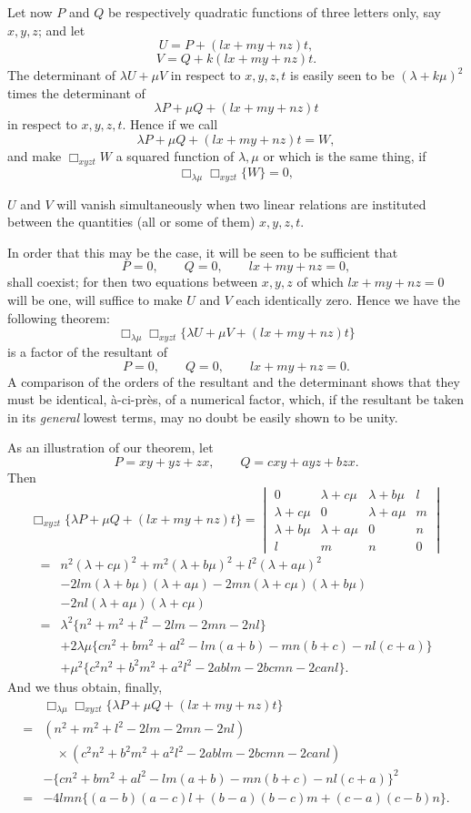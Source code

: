 \documentclass[11pt]{article}
\newcommand{\sourcepage}[1]{\marginpar{\scriptsize p.~#1}}
\begin{document}
Let now $P$ and $Q$ be respectively quadratic functions of three letters only, say $x,y,z$; and let
\[
U=P+(lx+my+nz)t,
\]
\[
V=Q+k(lx+my+nz)t.
\]
The determinant of $\lambda U+\mu V$ in respect to $x,y,z,t$ is easily seen to be $(\lambda+k\mu)^2$ times the determinant of
\[
\lambda P+\mu Q+(lx+my+nz)t
\]
in respect to $x,y,z,t$. Hence if we call
\[
\lambda P+\mu Q+(lx+my+nz)t=W,
\]
and make $\Box_{xyzt}W$ a squared function of $\lambda,\mu$ or which is the same thing, if
\[
\Box_{\lambda\mu}\Box_{xyzt}\{W\}=0,
\]

\sourcepage{140}
$U$ and $V$ will vanish simultaneously when two linear relations are instituted between the quantities (all or some of them) $x,y,z,t$.

In order that this may be the case, it will be seen to be sufficient that
\[
P=0,\qquad Q=0,\qquad lx+my+nz=0,
\]
shall coexist; for then two equations between $x,y,z$ of which $lx+my+nz=0$ will be one, will suffice to make $U$ and $V$ each identically zero. Hence we have the following theorem:
\[
\Box_{\lambda\mu}\Box_{xyzt}\{\lambda U+\mu V+(lx+my+nz)t\}
\]
is a factor of the resultant of
\[
P=0,\qquad Q=0,\qquad lx+my+nz=0.
\]
A comparison of the orders of the resultant and the determinant shows that they must be identical, \`a-ci-pr\`es, of a numerical factor, which, if the resultant be taken in its \emph{general} lowest terms, may no doubt be easily shown to be unity.

As an illustration of our theorem, let
\[
P=xy+yz+zx,\qquad
Q=cxy+ayz+bzx.
\]
Then
\[
\Box_{xyzt}\{\lambda P+\mu Q+(lx+my+nz)t\}
=
\begin{vmatrix}
0&\lambda+c\mu&\lambda+b\mu&l\\
\lambda+c\mu&0&\lambda+a\mu&m\\
\lambda+b\mu&\lambda+a\mu&0&n\\
l&m&n&0
\end{vmatrix}
\]
\[
\begin{aligned}
={}&n^2(\lambda+c\mu)^2+m^2(\lambda+b\mu)^2+l^2(\lambda+a\mu)^2\\
&-2lm(\lambda+b\mu)(\lambda+a\mu)
-2mn(\lambda+c\mu)(\lambda+b\mu)\\
&-2nl(\lambda+a\mu)(\lambda+c\mu)\\
={}&\lambda^2\{n^2+m^2+l^2-2lm-2mn-2nl\}\\
&+2\lambda\mu\{cn^2+bm^2+al^2-lm(a+b)-mn(b+c)-nl(c+a)\}\\
&+\mu^2\{c^2n^2+b^2m^2+a^2l^2-2ablm-2bcmn-2canl\}.
\end{aligned}
\]
And we thus obtain, finally,
\[
\begin{aligned}
&\Box_{\lambda\mu}\Box_{xyzt}\{\lambda P+\mu Q+(lx+my+nz)t\}\\
={}&(n^2+m^2+l^2-2lm-2mn-2nl)\\
&\quad\times(c^2n^2+b^2m^2+a^2l^2-2ablm-2bcmn-2canl)\\
&-\{cn^2+bm^2+al^2-lm(a+b)-mn(b+c)-nl(c+a)\}^2\\
={}&-4lmn\{(a-b)(a-c)l+(b-a)(b-c)m+(c-a)(c-b)n\}.
\end{aligned}
\]
\end{document}
